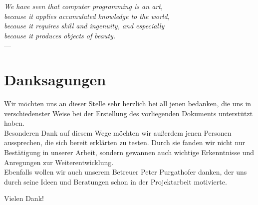 
\begin{flushright}{\slshape    
    We have seen that computer programming is an art, \\ 
    because it applies accumulated knowledge to the world, \\ 
    because it requires skill and ingenuity, and especially \\
    because it produces objects of beauty.} \\ \medskip
    ---  \citep{knuth:1974}
\end{flushright}



\bigskip

\begingroup
\let\clearpage\relax
\let\cleardoublepage\relax
\let\cleardoublepage\relax
\chapter*{Danksagungen}
Wir möchten uns an dieser Stelle sehr herzlich bei all jenen bedanken, die uns in verschiedenster Weise bei der Erstellung des vorliegenden Dokuments unterstützt haben. \\
Besonderen Dank auf diesem Wege möchten wir außerdem jenen Personen aussprechen, die sich bereit erklärten \scribbler zu testen. Durch sie fanden wir nicht nur Bestätigung in unserer Arbeit, sondern gewannen auch wichtige Erkenntnisse und Anregungen zur Weiterentwicklung.\\
Ebenfalls wollen wir auch unserem Betreuer Peter Purgathofer danken, der uns durch seine Ideen und Beratungen schon in der Projektarbeit motivierte.

\medskip \noindent Vielen Dank!


\endgroup



